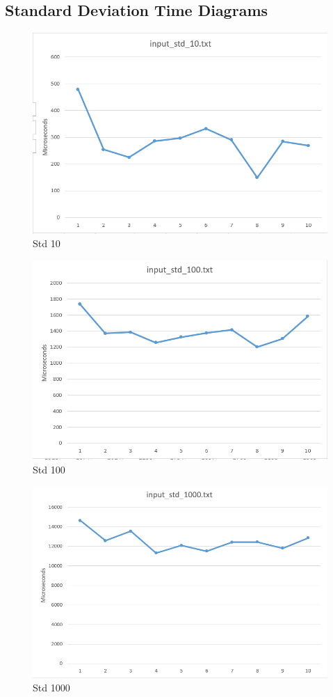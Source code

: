 \documentclass[a4paper, 12pt, titlepage]{article}
\begin{document}
\subsection{Standard Deviation Time Diagrams}
\begin{figure}[H]
	\centering
	\caption{Std 10}
	\includegraphics[width=.75\textwidth]{std10.png} %
\end{figure}

\begin{figure}[H]
	\centering
	\caption{Std 100}
	\includegraphics[width=.75\textwidth]{std100.png} %
\end{figure}

\begin{figure}[H]
	\centering
	\caption{Std 1000}
	\includegraphics[width=.75\textwidth]{std1000.png} %
\end{figure}
\end{document}
